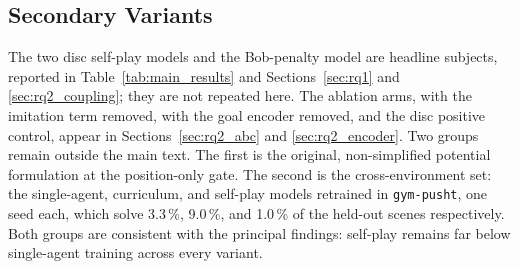 \subsection{Secondary Variants}
\label{app:secondary}

The two disc self-play models and the Bob-penalty model are headline subjects,
reported in Table~\ref{tab:main_results} and Sections~\ref{sec:rq1} and
\ref{sec:rq2_coupling}; they are not repeated here. The ablation arms, with the
imitation term removed, with the goal encoder removed, and the disc positive
control, appear in Sections~\ref{sec:rq2_abc} and \ref{sec:rq2_encoder}. Two
groups remain outside the main text. The first is the original, non-simplified
potential formulation at the position-only gate. The second is the
cross-environment set: the single-agent, curriculum, and self-play models
retrained in \texttt{gym-pusht}, one seed each, which solve 3.3\,\%, 9.0\,\%,
and 1.0\,\% of the held-out scenes respectively. Both groups are consistent with
the principal findings: self-play remains far below single-agent training across
every variant.
